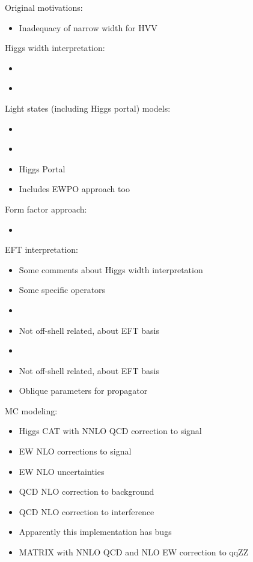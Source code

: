 \documentclass[11pt,letterpaper]{article}
\begin{document}
Original motivations:
\begin{itemize}
  \item \cite{Kauer:2012hd} Inadequacy of narrow width for HVV
\end{itemize}

Higgs width interpretation:
\begin{itemize}  
  \item \cite{Caola:2013yja}
  \item \cite{Campbell:2013una}
\end{itemize}

Light states (including Higgs portal) models:
\begin{itemize}
  \item \cite{Englert:2014aca}
  \item \cite{Englert:2014ffa}
  \item \cite{Goncalves:2017iub} Higgs Portal
  \item \cite{Englert:2020gcp} Includes EWPO approach too
\end{itemize}

Form factor approach:
\begin{itemize}
  \item \cite{Goncalves:2018pkt}
\end{itemize}

EFT interpretation:
\begin{itemize}
  \item \cite{Azatov:2014jga} Some comments about Higgs width interpretation
  \item \cite{Gainer:2014hha} Some specific operators
  \item \cite{Azatov:2016xik}
  \item \cite{Falkowski:2015wza} Not off-shell related, about EFT basis
  \item \cite{Contino:2016jqw}
  \item \cite{Falkowski:2001958} Not off-shell related, about EFT basis
  \item \cite{Englert:2019zmt} Oblique parameters for propagator
\end{itemize}

MC modeling:
\begin{itemize}
  \item \cite{Passarino:2013bha} Higgs CAT with NNLO QCD correction to signal
  \item \cite{Biedermann:2016yvs} EW NLO corrections to signal
  \item \cite{Gieseke:2014gka} EW NLO uncertainties
  \item \cite{Caola:2015psa} QCD NLO correction to background
  \item \cite{Caola:2016trd} QCD NLO correction to interference
  \item \cite{Alioli:2016xab} Apparently this implementation has bugs
  \item \cite{Kallweit:2019zez} MATRIX with NNLO QCD and NLO EW correction to qqZZ
\end{itemize}
\end{document}

